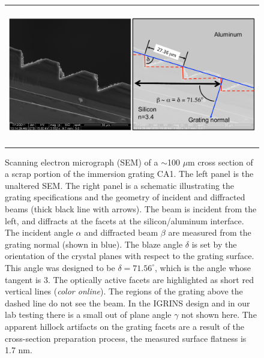    \begin{figure}
   \begin{center}
   \begin{tabular}{c}
   \includegraphics[height=6cm]{chSPIE_2012_CA1/figs/CA1_SEM_cross3}
   \end{tabular}
   \end{center}
   \caption[CA1a SEM]{ \label{fig:CA1aSEM}  Scanning electron micrograph (SEM) of a $\sim$100 $\mu$m cross section of a scrap portion of the immersion grating CA1.  The left panel is the unaltered SEM.  The right panel is a schematic illustrating the grating specifications and the geometry of incident and diffracted beams (thick black line with arrows).  The beam is incident from the left, and diffracts at the facets at the silicon/aluminum interface.  The incident angle $\alpha$ and diffracted beam $\beta$ are measured from the grating normal (shown in blue).  The blaze angle $\delta$ is set by the orientation of the crystal planes with respect to the grating surface.  This angle was designed to be $\delta=71.56^\circ$, which is the angle whose tangent is 3.  The optically active facets are highlighted as short red vertical lines (\emph{color online}).  The regions of the grating above the dashed line do not see the beam.  In the IGRINS design and in our lab testing there is a small out of plane angle $\gamma$ not shown here.  The apparent hillock artifacts on the grating facets are a result of the cross-section preparation process, the measured\cite{2010SPIE.7739E.146W} surface flatness is 1.7 nm.}
   \end{figure} 

